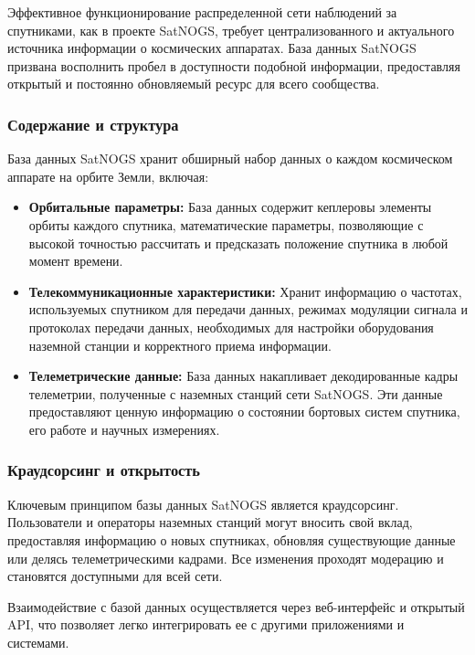\documentclass[14pt, a4paper]{extreport}
\begin{document}
    Эффективное функционирование распределенной сети наблюдений за спутниками, как в проекте SatNOGS, требует централизованного и актуального источника информации о космических аппаратах.
    База данных SatNOGS призвана восполнить пробел в доступности подобной информации, предоставляя открытый и постоянно обновляемый ресурс для всего сообщества.

    \subsubsection{Содержание и структура}

    База данных SatNOGS хранит обширный набор данных о каждом космическом аппарате на орбите Земли, включая:

    \begin{itemize}
        \item \textbf{Орбитальные параметры:} База данных содержит кеплеровы элементы орбиты каждого спутника,  математические параметры, позволяющие с высокой точностью рассчитать и предсказать положение спутника в любой момент времени.
        \item \textbf{Телекоммуникационные характеристики:} Хранит информацию о частотах, используемых спутником для передачи данных,  режимах модуляции сигнала и протоколах передачи данных, необходимых для настройки оборудования наземной станции и корректного приема информации.
        \item \textbf{Телеметрические данные:}  База данных накапливает декодированные кадры телеметрии, полученные с наземных станций сети SatNOGS. Эти данные предоставляют ценную информацию о состоянии бортовых систем спутника, его работе и научных измерениях.
    \end{itemize}

    \subsubsection{Краудсорсинг и открытость}

    Ключевым принципом базы данных SatNOGS является краудсорсинг.
    Пользователи и операторы наземных станций могут вносить свой вклад, предоставляя информацию о новых спутниках, обновляя существующие данные или делясь телеметрическими кадрами.
    Все изменения проходят модерацию и становятся доступными для всей сети.

    Взаимодействие с базой данных осуществляется через веб-интерфейс и открытый API, что позволяет легко интегрировать ее с другими приложениями и системами.
\end{document}
